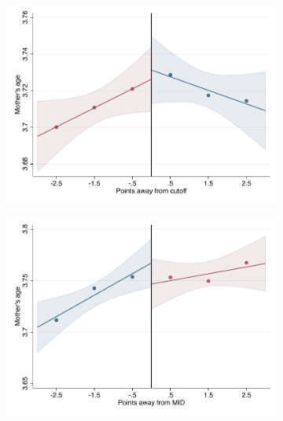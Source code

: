 \documentclass[oneside,11pt]{article}
\begin{document}
\begin{figure}[H]

    \ContinuedFloat
    \caption{(Continued) RD plots for balance variables across those assigned to UNAM high-school, and those who are not\label{fig:Balance_rd_plot_UNAM_3}}
    \begin{center}

    \begin{subfigure}{0.475\textwidth}
        \centering
        \includegraphics[width=\textwidth]{04_Figures/rd_plot_tau_edad_mad_UNAM3.pdf}
    \end{subfigure}
    \begin{subfigure}{0.475\textwidth}
        \centering
        \includegraphics[width=\textwidth]{04_Figures/rd_plot_mid_edad_mad_UNAM3.pdf}
    \end{subfigure}
    \end{center}
    

\end{figure}
\end{document}
